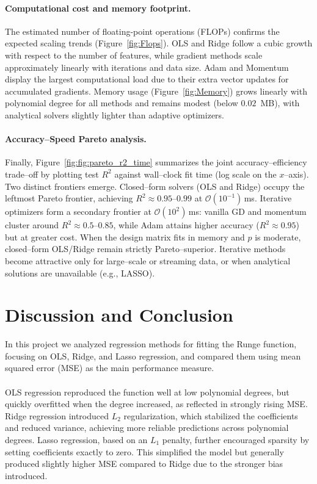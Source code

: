 \documentclass[
 reprint,            %
 amsmath,amssymb,
 aps,
]{revtex4-2}
\begin{document}
\paragraph*{Computational cost and memory footprint.}
The estimated number of floating-point operations (FLOPs) confirms the expected scaling trends (Figure~\ref{fig:Flops}).
OLS and Ridge follow a cubic growth with respect to the number of features, while gradient methods scale approximately linearly with iterations and data size. 
Adam and Momentum display the largest computational load due to their extra vector updates for accumulated gradients.
Memory usage (Figure~\ref{fig:Memory}) grows linearly with polynomial degree for all methods and remains modest (below $0.02$~MB), with analytical solvers slightly lighter than adaptive optimizers.




\paragraph*{Accuracy–Speed Pareto analysis.}
Finally, Figure~\ref{fig:fig:pareto_r2_time} summarizes the joint accuracy–efficiency trade–off by plotting test $R^2$ against wall–clock fit time (log scale on the $x$–axis). 
Two distinct frontiers emerge.  
Closed–form solvers (OLS and Ridge) occupy the leftmost Pareto frontier, achieving $R^2\approx0.95$–$0.99$ at $\mathcal{O}(10^{-1})$\,ms.  
Iterative optimizers form a secondary frontier at $\mathcal{O}(10^2)$\,ms: vanilla GD and momentum cluster around $R^2\approx0.5$–$0.85$, while Adam attains higher accuracy ($R^2\approx0.95$) but at greater cost. 
When the design matrix fits in memory and $p$ is moderate, closed–form OLS/Ridge remain strictly Pareto–superior. 
Iterative methods become attractive only for large–scale or streaming data, or when analytical solutions are unavailable (e.g., LASSO).
% 



\section{Discussion and Conclusion}
\label{sec:Discussion_and_Conclusion}
In this project we analyzed regression methods for fitting the Runge function, focusing on OLS, Ridge, and Lasso regression, and compared them using mean squared error (MSE) as the main performance measure.\\\\

OLS regression reproduced the function well at low polynomial degrees, but quickly overfitted when the degree increased, as reflected in strongly rising MSE.
Ridge regression introduced $L_2$ regularization, which stabilized the coefficients and reduced variance, achieving more reliable predictions across polynomial degrees.
Lasso regression, based on an $L_1$ penalty, further encouraged sparsity by setting coefficients exactly to zero.
This simplified the model but generally produced slightly higher MSE compared to Ridge due to the stronger bias introduced.\\\\
\end{document}
